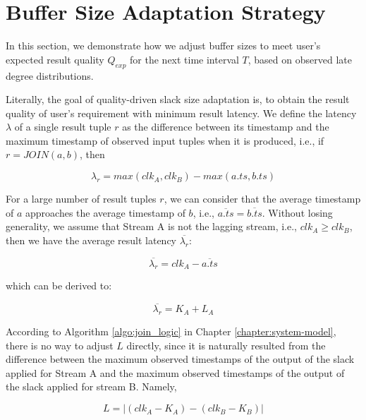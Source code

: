 \documentclass[a4paper, 11pt, twoside]{report}
\begin{document}
\section{Buffer Size Adaptation Strategy}
\label{sec:adaptation-strategy}

In this section, we demonstrate how we adjust buffer sizes to meet user's expected result quality $Q_{exp}$ for the next time interval $T$, based on observed late degree distributions.\\

%

Literally, the goal of quality-driven slack size adaptation is, to obtain the result quality of user's requirement with minimum result latency. We define the latency $\lambda$ of a single result tuple $r$ as the difference between its timestamp and the maximum timestamp of observed input tuples when it is produced, i.e., if $r=JOIN(a,b)$, then

\begin{equation}
	\lambda _r=max(clk_A, clk_B)-max(a.ts, b.ts)
\end{equation}

%

For a large number of result tuples $r$, we can consider that the average timestamp of $a$ approaches the average timestamp of $b$, i.e., $\overline{a.ts}=\overline{b.ts}$. Without losing generality, we assume that Stream A is not the lagging stream, i.e., $clk_A \geq clk_B$, then we have the average result latency $\overline{\lambda _r}$:

\begin{equation}
	\overline{\lambda _r}=clk_A-\overline{a.ts}
\end{equation}

which can be derived to:

\begin{equation}
\label{eq:latency}
	\overline{\lambda _r}=K_A+L_A
\end{equation}

According to Algorithm \ref{algo:join_logic} in Chapter \ref{chapter:system-model}, there is no way to adjust $L$ directly, since it is naturally resulted from the difference between the maximum observed timestamps of the output of the slack applied for Stream A and the maximum observed timestamps of the output of the slack applied for stream B. Namely,

\begin{equation}
	L=|(clk_A-K_A)-(clk_B-K_B)|
\end{equation}
\end{document}
